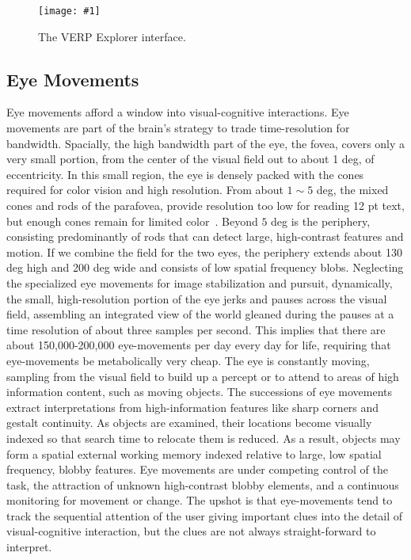 \documentclass{sigchi}
\newcommand{\insertpicture}[2]{\begin{center}\texttt{[image: \#1]}\end{center}}
\begin{document}
\begin{figure}
	\insertpicture{figures/interface.pdf}{0.85}
	\caption{The VERP Explorer interface.\label{fig:interface}}
\end{figure}

\subsection{Eye Movements} Eye movements afford a window into
visual-cognitive interactions. Eye movements are part of the brain's strategy to trade time-resolution for bandwidth. Spacially, the high bandwidth part of the eye, the fovea, covers only a very small portion, from the center of the visual field out to about 1 deg, of eccentricity.
 In this small region, the eye is densely packed with the cones required for
color vision and high resolution. From about $1\sim 5$ deg, the mixed cones and rods
of the parafovea, provide resolution too low for reading 12 pt text, but enough cones remain for limited color~\cite{Kieras_2014}.  Beyond $ 5$ deg is
the periphery, consisting predominantly of rods that can detect large, high-contrast
features and motion. If we combine the field for the two eyes, the
periphery extends about 130 deg high and 200 deg wide and consists of low spatial
frequency blobs. Neglecting the specialized eye movements for image stabilization and pursuit, dynamically, the small, high-resolution portion of the eye jerks and pauses across  the visual field, assembling an integrated view of the world gleaned during the pauses at a time resolution of about three
samples per second. This implies that there are about 150,000-200,000
eye-movements per day every day for life, requiring that eye-movements be
metabolically very cheap.  The eye is constantly moving, sampling from the
visual field to build up a percept or to attend to areas of high
information content, such as moving objects. The successions of eye
movements extract interpretations from high-information features like sharp
corners and gestalt continuity. As objects are examined, their locations
become visually indexed so that search time to relocate them is reduced. As
a result, objects may form a spatial external working memory indexed
relative to large, low spatial frequency, blobby features. Eye movements
are under competing control of the task, the attraction of unknown
high-contrast blobby elements, and a continuous monitoring for movement or
change. The upshot is that eye-movements tend to track the sequential
attention of the user giving important clues into the detail of
visual-cognitive interaction, but the clues are not always straight-forward
to interpret. 
\end{document}
